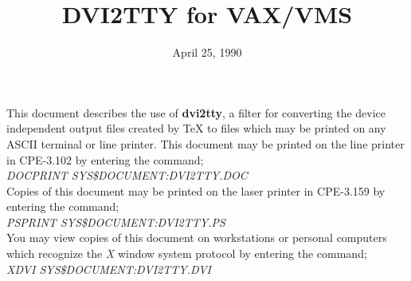 %
%
%
%
%
%
\parindent 0pt
\marginparpush 5pt 
\headheight 5pt
\headsep 0pt
\footheight 5pt
\footskip 15pt 
\columnsep 10pt
\columnseprule 0pt 
\marginparwidth 0pt
\oddsidemargin  0pt
\evensidemargin  0pt
\marginparsep 0pt
\topmargin   0pt
\textwidth   6.5in
\textheight  9.0in
%
\newcommand{\bs}{$\backslash$}
%
\title{{\bf DVI2TTY for VAX/VMS}}
\author{}
\date{April 25, 1990} 
%

\maketitle
%
%
This document describes the use of {\bf dvi2tty}\/, a filter for converting
the device independent output files created by \TeX\/ to files which may
be printed on any ASCII terminal or line printer.
This document may be printed on the line printer in CPE-3.102 by entering
the command;
\\[1ex]
{\em DOCPRINT SYS\$DOCUMENT:DVI2TTY.DOC}
\\[1ex]
Copies of this document may be printed on the laser printer in CPE-3.159
by entering the command;
\\[1ex]
{\em PSPRINT SYS\$DOCUMENT:DVI2TTY.PS}
\\[1ex]
You may view copies of this document on workstations or personal computers
which recognize the {\it X}\/ window system protocol by entering the command;
\\[1ex]                                                          
{\em XDVI SYS\$DOCUMENT:DVI2TTY.DVI}
